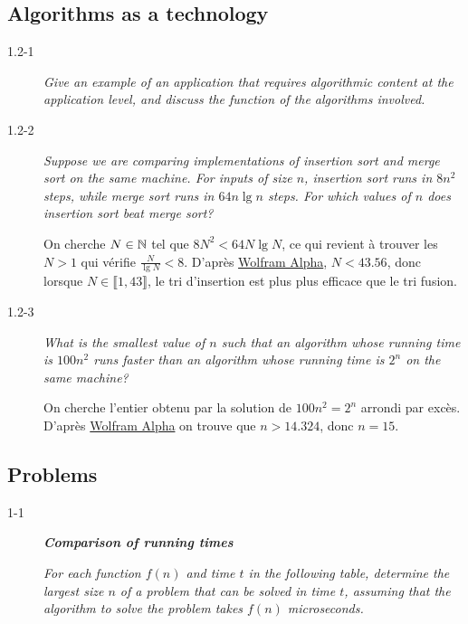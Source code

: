 \subsection{Algorithms as a technology}

\begin{description}
  \item[1.2-1] {\itshape Give an example of an application that requires algorithmic content at the application level, and discuss the function of the algorithms involved.}

    \begin{exrev}
      
    \end{exrev}

  \item[1.2-2] {\itshape Suppose we are comparing implementations of insertion sort and merge sort on the same machine. For inputs of size $n$, insertion sort runs in $8n^2$ steps, while merge sort runs in $64n\lg n$ steps. For which values of $n$ does insertion sort beat merge sort?}

    \begin{ex}
      On cherche $N \in \mathbb{N}$ tel que $8N^2 < 64N\lg N$, ce qui revient \`a trouver les $N > 1$ qui v\'erifie $\frac{N}{\lg N} < 8$. D'apr\`es \href{https://www.wolframalpha.com/input/?i=N%2Flog_2(N)+%3C+8}{Wolfram Alpha}, $N < 43.56$, donc lorsque $N\in\llbracket 1,43  \rrbracket$, le tri d'insertion est plus plus efficace que le tri fusion.
    \end{ex}

  \item[1.2-3] {\itshape What is the smallest value of $n$ such that an algorithm whose running time is $100n^2$ runs faster than an algorithm whose running time is $2^n$ on the same machine?}

    \begin{ex}
      On cherche l'entier obtenu par la solution de $100n^2 = 2^n $ arrondi par exc\`es. D'apr\`es \href{https://www.wolframalpha.com/input/?i=100*n%5E2+%3C+2%5En}{Wolfram Alpha} on trouve que $n > 14.324$, donc $n=15$.
    \end{ex}  

\end{description}

\subsection{Problems} 

\begin{description}
  \item[1-1] \textbf{\itshape Comparison of running times}

    {\itshape For each function $f(n)$ and time $t$ in the following table, determine the largest size $n$ of a problem that can be solved in time $t$, assuming that the algorithm to solve the problem takes $f(n)$ microseconds.}

    \begin{pbrev}
      
    \end{pbrev}


\end{description}

